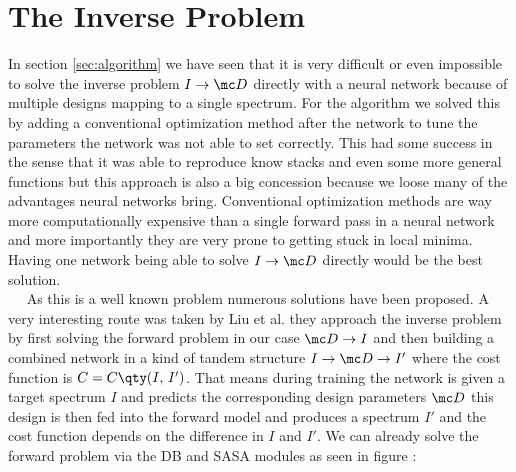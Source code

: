 \section{The Inverse Problem}
In section \ref{sec:algorithm} we have seen that it is very difficult or even impossible to solve the inverse problem $I \rightarrow \mc D$ directly with a neural network because of multiple designs mapping to a single spectrum. For the algorithm we solved this by adding a conventional optimization method after the network to tune the parameters the network was not able to set correctly. This had some success in the sense that it was able to reproduce know stacks and even some more general functions  but this approach is also a big concession because we loose many of the advantages neural networks bring. Conventional optimization methods are way more computationally expensive than a single forward pass in a neural network and more importantly they are very prone to getting stuck in local minima. Having one network being able to solve $I \rightarrow \mc D$ directly would be the best solution.
\\

$\quad$ As this is a well known problem numerous solutions have been proposed. A very interesting route was taken by Liu et al. \cite{Liu2018} they approach the inverse problem by first solving the forward problem in our case $\mc D \rightarrow I$ and then building a combined network in a kind of tandem structure 
$I \rightarrow \mc D \rightarrow I'$
where the cost function is 
$C = C \qty(I, \, I')$.
That means during training the network is given a target spectrum $I$ and predicts the corresponding design parameters $\mc D$ this design is then fed into the forward model and produces a spectrum $I'$ and the cost function depends on the difference in $I$ and $I'$. We can already solve the forward problem via the DB and SASA modules as seen in figure :

